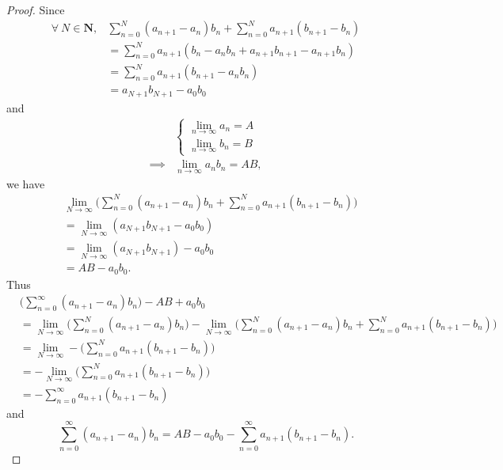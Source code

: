 \begin{proof}
    Since
    \begin{align*}
        \forall\ N \in \mathbf{N}, & \sum_{n = 0}^N (a_{n + 1} - a_n) b_n + \sum_{n = 0}^N a_{n + 1} (b_{n + 1} - b_n) \\
                                   & = \sum_{n = 0}^N a_{n + 1} (b_n - a_n b_n + a_{n + 1} b_{n + 1} - a_{n + 1} b_n)  \\
                                   & = \sum_{n = 0}^N a_{n + 1} (b_{n + 1} - a_n b_n)                                  \\
                                   & = a_{N + 1} b_{N + 1} - a_0 b_0
    \end{align*}
    and
    \begin{align*}
                 & \begin{cases}
            \lim_{n \to \infty} a_n = A \\
            \lim_{n \to \infty} b_n = B
        \end{cases}         \\
        \implies & \lim_{n \to \infty} a_n b_n = AB,
    \end{align*}
    we have
    \begin{align*}
         & \lim_{N \to \infty} \bigg(\sum_{n = 0}^N (a_{n + 1} - a_n) b_n + \sum_{n = 0}^N a_{n + 1} (b_{n + 1} - b_n)\bigg) \\
         & = \lim_{N \to \infty} (a_{N + 1} b_{N + 1} - a_0 b_0)                                                             \\
         & = \lim_{N \to \infty} (a_{N + 1} b_{N + 1}) - a_0 b_0                                                             \\
         & = AB - a_0 b_0.
    \end{align*}
    Thus
    \begin{align*}
         & \bigg(\sum_{n = 0}^\infty (a_{n + 1} - a_n) b_n\bigg) - AB + a_0 b_0                                                                                                                       \\
         & = \lim_{N \to \infty} \bigg(\sum_{n = 0}^N (a_{n + 1} - a_n) b_n\bigg) - \lim_{N \to \infty} \bigg(\sum_{n = 0}^N (a_{n + 1} - a_n) b_n + \sum_{n = 0}^N a_{n + 1} (b_{n + 1} - b_n)\bigg) \\
         & = \lim_{N \to \infty} - \bigg(\sum_{n = 0}^N a_{n + 1} (b_{n + 1} - b_n)\bigg)                                                                                                             \\
         & = - \lim_{N \to \infty} \bigg(\sum_{n = 0}^N a_{n + 1} (b_{n + 1} - b_n)\bigg)                                                                                                             \\
         & = - \sum_{n = 0}^\infty a_{n + 1} (b_{n + 1} - b_n)
    \end{align*}
    and
    \[
        \sum_{n = 0}^\infty (a_{n + 1} - a_n) b_n = AB - a_0 b_0 - \sum_{n = 0}^\infty a_{n + 1} (b_{n + 1} - b_n).
    \]
\end{proof}

